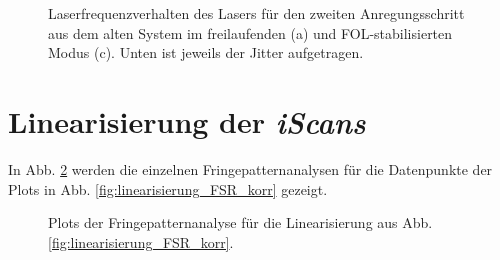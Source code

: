 \begin{figure}[hp]
 	\centering
 	\footnotesize
 	\fbox{\parbox{\dimexpr \linewidth - 2\fboxrule - 2\fboxsep}{
 	\subfloat[]{
		\label{subfig:laserstabilitaet_alt_freilaufend}
		
		}\\
	 \subfloat[]{
		\label{subfig:laserstabilitaet_alt_FOL}
		
		}
	}}
	\caption[Laserfrequenzverhalten, altes System]{Laserfrequenzverhalten des
	Lasers für den zweiten Anregungsschritt aus dem alten System im freilaufenden
	(a) und FOL-stabilisierten Modus (c). Unten ist jeweils der Jitter
	aufgetragen.}
	\label{fig:laserstabilitaet_c}
\end{figure}

\newpage
\section{Linearisierung der
\textit{iScans}}\label{anh:sec:linearisierung}
In Abb. \ref{fig:linearisierung_FSR_korr_anh} werden die einzelnen
Fringepatternanalysen für die Datenpunkte der Plots in Abb.
\ref{fig:linearisierung_FSR_korr} gezeigt.
\begin{figure}[hb]
 	\centering
 	\footnotesize
	\caption[Linearität \textit{iScan}, Fringepatternanalyse]{Plots der
	Fringepatternanalyse für die Linearisierung aus Abb. \ref{fig:linearisierung_FSR_korr}.}
	\label{fig:linearisierung_FSR_korr_anh}
\end{figure}
